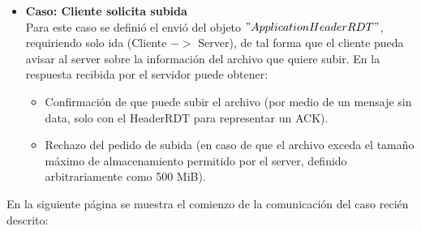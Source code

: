 \documentclass[11pt,a4paper]{article}
\begin{document}
\begin{itemize}
    \renewcommand\labelitemi{$->$}
    \item \textbf{Caso: Cliente solicita subida} \\
    Para este caso se definió el envió del objeto $"ApplicationHeaderRDT"$, requiriendo solo ida (Cliente $->$ Server), de tal forma que el cliente pueda avisar al server sobre la información del archivo que quiere subir. En la respuesta recibida por el servidor puede obtener:
    \begin{itemize}
        \item Confirmación de que puede subir el archivo (por medio de un mensaje sin data, solo con el HeaderRDT para representar un ACK).
        \item Rechazo del pedido de subida (en caso de que el archivo exceda el tamaño máximo de almacenamiento permitido por el server, definido arbitrariamente como 500 MiB).
    \end{itemize}
\end{itemize}

En la siguiente página se muestra el comienzo de la comunicación del caso recién descrito:

\newpage
\end{document}
